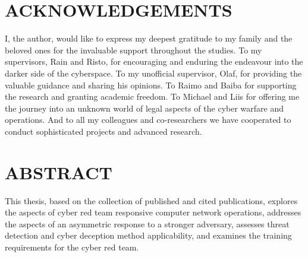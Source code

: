 






\FloatBarrier %

\clearpage %

\section*{ACKNOWLEDGEMENTS}
I, the author, would like to express my deepest gratitude to my family and the beloved ones for the invaluable support throughout the studies. To my supervisors, Rain and Risto, for encouraging and enduring the endeavour into the darker side of the cyberspace. To my unofficial supervisor, Olaf, for providing the valuable guidance and sharing his opinions. To Raimo and Baiba for supporting the research and granting academic freedom. To Michael and Liis for offering me the journey into an unknown world of legal aspects of the cyber warfare and operations. And to all my colleagues and co-researchers we have cooperated to conduct sophisticated projects and advanced research.

\section*{ABSTRACT \\ \ThesisTitleENG}
This thesis, based on the collection of published and cited publications, explores the aspects of cyber red team responsive computer network operations, addresses the aspects of an asymmetric response to a stronger adversary, assesses threat detection and cyber deception method applicability, and examines the training requirements for the cyber red team.

